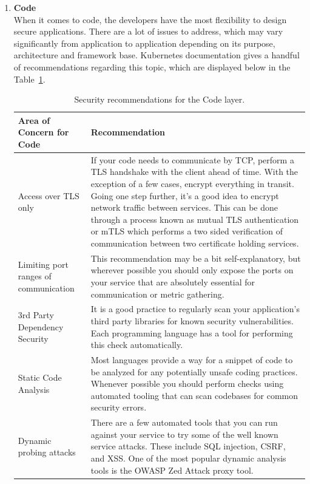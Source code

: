 \begin{enumerate}
\item \textbf{Code} \\
When it comes to code, the developers have the most flexibility to design secure applications. There are a lot of issues to address, which may vary significantly from application to application depending on its purpose, architecture and framework base. Kubernetes documentation gives a handful of recommendations regarding this topic, which are displayed below in the Table~\ref{tab:code-security-recommendations}.

\begin{table}[H]
    \begin{center}
        \begin{tabular}{ | p{} | p{} | } 
        \hline
        \textbf{Area of Concern for Code} & \textbf{Recommendation} \\ 
        \hline
        Access over TLS only & If your code needs to communicate by TCP, perform a TLS handshake with the client ahead of time. With the exception of a few cases, encrypt everything in transit. Going one step further, it's a good idea to encrypt network traffic between services. This can be done through a process known as mutual TLS authentication or mTLS which performs a two sided verification of communication between two certificate holding services. \\ 
        \hline
        Limiting port ranges of communication & This recommendation may be a bit self-explanatory, but wherever possible you should only expose the ports on your service that are absolutely essential for communication or metric gathering. \\ 
        \hline
        3rd Party Dependency Security & It is a good practice to regularly scan your application's third party libraries for known security vulnerabilities. Each programming language has a tool for performing this check automatically. \\
        \hline
        Static Code Analysis & Most languages provide a way for a snippet of code to be analyzed for any potentially unsafe coding practices. Whenever possible you should perform checks using automated tooling that can scan codebases for common security errors. \\
        \hline
        Dynamic probing attacks & There are a few automated tools that you can run against your service to try some of the well known service attacks. These include SQL injection, CSRF, and XSS. One of the most popular dynamic analysis tools is the OWASP Zed Attack proxy tool. \\
        \hline
        \end{tabular}
    \end{center}
    \caption{Security recommendations for the Code layer.}
    \label{tab:code-security-recommendations}
\end{table}
                      
\end{enumerate}

